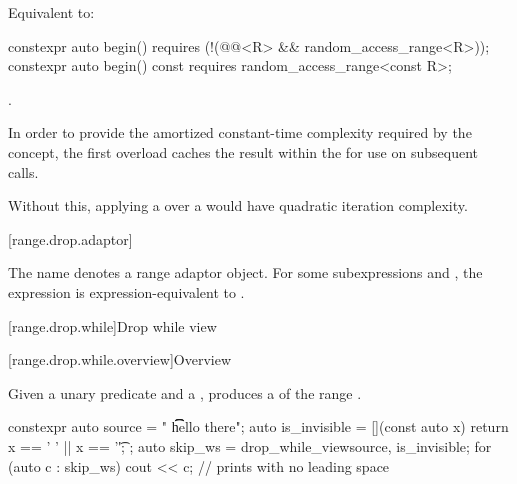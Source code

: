 \documentclass{wg21}
\begin{document}
\begin{itemdescr}
\pnum
\effects
Equivalent to: 
\end{itemdescr}

%
\begin{itemdecl}
constexpr auto begin()
requires (!(@@<R> && random_access_range<R>));
constexpr auto begin() const
requires random_access_range<const R>;
\end{itemdecl}

\begin{itemdescr}
\pnum
\returns
{}.

\pnum
\remarks
In order to provide the amortized constant-time complexity required
by the  concept,
the first overload caches the result within the 
for use on subsequent calls.
\begin{note}
	Without this,
	applying a  over a 
	would have quadratic iteration complexity.
\end{note}
\end{itemdescr}

[range.drop.adaptor]{}

\pnum
The name  denotes
a range adaptor object.
For some subexpressions  and ,
the expression 
is expression-equivalent to .

[range.drop.while]{Drop while view}

[range.drop.while.overview]{Overview}

\pnum
Given a unary predicate  and a  ,
 produces a 
of the range .

\pnum
\begin{example}
\begin{codeblock}
	constexpr auto source = "  \t   \t   \t   hello there";
	auto is_invisible = [](const auto x) { return x == ' ' || x == '\t'; };
	auto skip_ws = drop_while_view{source, is_invisible};
	for (auto c : skip_ws) {
		cout << c;                                    // prints  with no leading space
	}
\end{codeblock}
\end{example}
\end{document}
